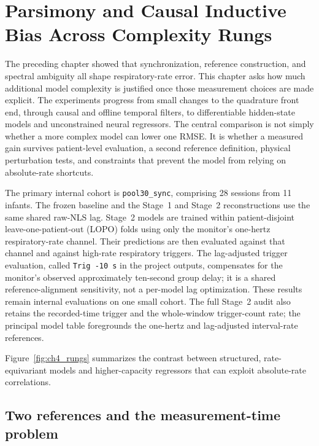 \chapter{Parsimony and Causal Inductive Bias Across Complexity Rungs}
\label{ch:parsimony_complexity}

The preceding chapter showed that synchronization, reference construction, and spectral
ambiguity all shape respiratory-rate error. This chapter asks how much additional model
complexity is justified once those measurement choices are made explicit. The experiments
progress from small changes to the quadrature front end, through causal and offline temporal
filters, to differentiable hidden-state models and unconstrained neural regressors. The central
comparison is not simply whether a more complex model can lower one RMSE. It is whether a
measured gain survives patient-level evaluation, a second reference definition, physical
perturbation tests, and constraints that prevent the model from relying on absolute-rate
shortcuts.

The primary internal cohort is \texttt{pool30\_sync}, comprising 28 sessions from 11 infants.
The frozen baseline and the Stage~1 and Stage~2 reconstructions use the same shared raw-NLS lag.
Stage~2 models are trained within patient-disjoint leave-one-patient-out (LOPO) folds using only
the monitor's one-hertz respiratory-rate channel. Their predictions are then evaluated against
that channel and against high-rate respiratory triggers. The lag-adjusted trigger evaluation,
called \texttt{Trig -10 s} in the project outputs, compensates for the monitor's observed
approximately ten-second group delay; it is a shared reference-alignment sensitivity, not a
per-model lag optimization. These results remain internal evaluations on one small cohort.
The full Stage~2 audit also retains the recorded-time trigger and the whole-window trigger-count
rate; the principal model table foregrounds the one-hertz and lag-adjusted interval-rate
references.

Figure~\ref{fig:ch4_rungs} summarizes the contrast between structured, rate-equivariant models
and higher-capacity regressors that can exploit absolute-rate correlations.


\section{Two references and the measurement-time problem}
\label{sec:ch4_references}

